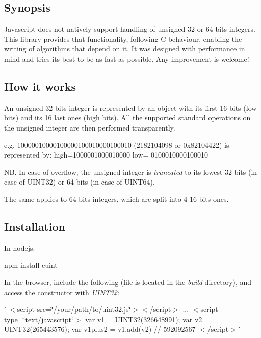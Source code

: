 \subsection*{Synopsis}

Javascript does not natively support handling of unsigned 32 or 64 bits integers. This library provides that functionality, following C behaviour, enabling the writing of algorithms that depend on it. It was designed with performance in mind and tries its best to be as fast as possible. Any improvement is welcome!

\subsection*{How it works}

An unsigned 32 bits integer is represented by an object with its first 16 bits (low bits) and its 16 last ones (high bits). All the supported standard operations on the unsigned integer are then performed transparently. \begin{DoxyVerb}e.g.
10000010000100000100010000100010 (2182104098 or 0x82104422) is represented by:
high=1000001000010000
low= 0100010000100010
\end{DoxyVerb}


NB. In case of overflow, the unsigned integer is {\itshape truncated} to its lowest 32 bits (in case of U\+I\+N\+T32) or 64 bits (in case of U\+I\+N\+T64).

The same applies to 64 bits integers, which are split into 4 16 bits ones.

\subsection*{Installation}

In nodejs\+: \begin{DoxyVerb}npm install cuint
\end{DoxyVerb}


In the browser, include the following (file is located in the {\itshape build} directory), and access the constructor with {\itshape U\+I\+N\+T32}\+:

\`{}$<$script src=\char`\"{}/your/path/to/uint32.\+js\char`\"{}$>$$<$/script$>$ ... $<$script type=\char`\"{}text/javascript\char`\"{}$>$ var v1 = U\+I\+N\+T32(\textquotesingle{}326648991\textquotesingle{}); var v2 = U\+I\+N\+T32(\textquotesingle{}265443576\textquotesingle{}); var v1plus2 = v1.\+add(v2) // 592092567 $<$/script$>$\`{}

